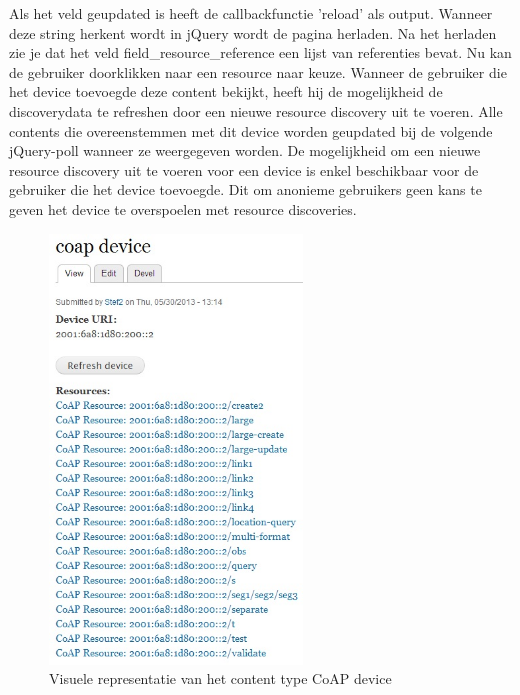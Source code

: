 Als het veld geupdated is heeft de callbackfunctie 'reload' als output. Wanneer deze string herkent wordt in jQuery wordt de pagina herladen. Na het herladen zie je dat het veld field\_resource\_reference een lijst van referenties bevat. Nu kan de gebruiker doorklikken naar een resource naar keuze. Wanneer de gebruiker die het device toevoegde deze content bekijkt, heeft hij de mogelijkheid de discoverydata te refreshen door een nieuwe resource discovery uit te voeren. Alle contents die overeenstemmen met dit device worden geupdated bij de volgende jQuery-poll wanneer ze weergegeven worden. De mogelijkheid om een nieuwe resource discovery uit te voeren voor een device is enkel beschikbaar voor de gebruiker die het device toevoegde. Dit om anonieme gebruikers geen kans te geven het device te overspoelen met resource discoveries.
\begin{figure}[h!]
\centering
\includegraphics[width=0.6\textwidth]{fig/coap_device}
\caption{Visuele representatie van het content type CoAP device}
\label{fig:coapDevice}
\end{figure}


